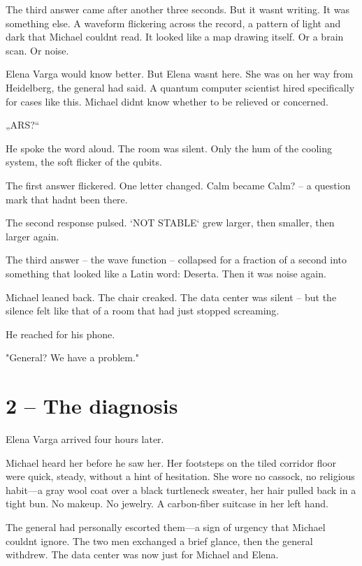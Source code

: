 \documentclass[
]{article}
\begin{document}
The third answer came after another three seconds. But it wasn\textquotesingle t writing. It was something else. A waveform flickering across the record, a pattern of light and dark that Michael couldn\textquotesingle t read. It looked like a map drawing itself. Or a brain scan. Or noise.

Elena Varga would know better. But Elena wasn\textquotesingle t here. She was on her way from Heidelberg, the general had said. A quantum computer scientist hired specifically for cases like this. Michael didn\textquotesingle t know whether to be relieved or concerned.

„ARS?{\kern0pt}``

He spoke the word aloud. The room was silent. Only the hum of the cooling system, the soft flicker of the qubits.

The first answer flickered. One letter changed. \textquotesingle Calm\textquotesingle{} became \textquotesingle Calm?\textquotesingle{} -- a question mark that hadn\textquotesingle t been there.

The second response pulsed. `NOT STABLE` grew larger, then smaller, then larger again.

The third answer -- the wave function -- collapsed for a fraction of a second into something that looked like a Latin word: \textquotesingle Deserta\textquotesingle. Then it was noise again.

Michael leaned back. The chair creaked. The data center was silent -- \hspace{0pt}\hspace{0pt}but the silence felt like that of a room that had just stopped screaming.

He reached for his phone.

"General? We have a problem."

\section{2 -- The diagnosis}\label{the-diagnosis}

Elena Varga arrived four hours later.

Michael heard her before he saw her. Her footsteps on the tiled corridor floor were quick, steady, without a hint of hesitation. She wore no cassock, no religious habit---a gray wool coat over a black turtleneck sweater, her hair pulled back in a tight bun. No makeup. No jewelry. A carbon-fiber suitcase in her left hand.

The general had personally escorted them---a sign of urgency that Michael couldn\textquotesingle t ignore. The two men exchanged a brief glance, then the general withdrew. The data center was now just for Michael and Elena.
\end{document}
